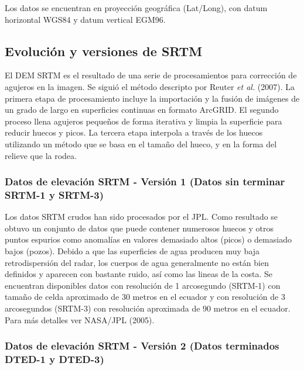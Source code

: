 \documentclass[10pt,a4paper, twoside]{report}
\begin{document}
Los datos se encuentran en proyección geográfica (Lat/Long), con datum horizontal WGS84 y datum vertical EGM96.

\subsection{Evolución y versiones de SRTM}

El DEM SRTM es el resultado de una serie de procesamientos para corrección de agujeros en la imagen. Se siguió el método descripto por Reuter \textit{et al.} (2007). La primera etapa de procesamiento incluye la importación y la fusión de imágenes de un grado de largo en superficies continuas en formato ArcGRID. El segundo proceso llena agujeros pequeños de forma iterativa y limpia la superficie para reducir huecos y picos. La tercera etapa interpola a través de los huecos utilizando un método que se basa en el tamaño del hueco, y en la forma del relieve que la rodea.

\subsubsection{Datos de elevación SRTM - Versión 1 (Datos sin terminar SRTM-1 y SRTM-3)}

Los datos SRTM crudos han sido procesados por el JPL. Como resultado se obtuvo un conjunto de datos que puede contener numerosos huecos y otros puntos espurios como anomalías en valores demasiado altos (picos) o demasiado bajos (pozos). Debido a que las superficies de agua producen muy baja retrodispersión del radar, los cuerpos de agua generalmente no están bien definidos y aparecen con bastante ruido, así como las lineas de la costa. Se encuentran disponibles datos con resolución de 1 arcosegundo (SRTM-1) con tamaño de celda aproximado de 30 metros en el ecuador y con resolución de 3 arcosegundos (SRTM-3) con resolución aproximada de 90 metros en el ecuador. Para más detalles ver NASA/JPL (2005).


\subsubsection{Datos de elevación SRTM - Versión 2 (Datos terminados DTED-1 y DTED-3)}
\label{SRTMDefincion}
\end{document}
